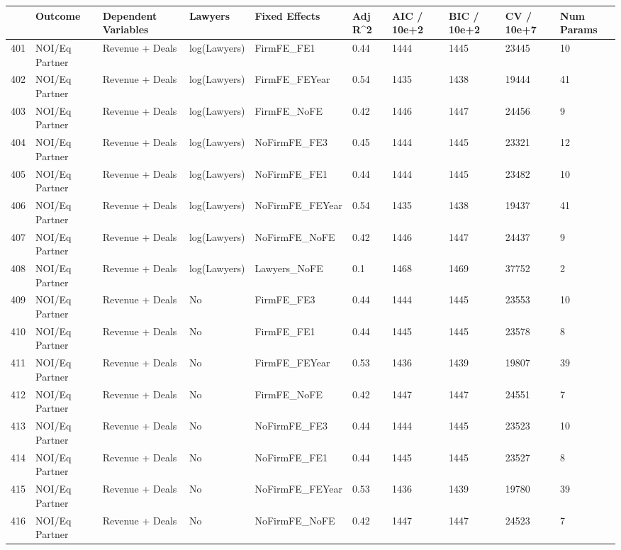 \documentclass{article}
\begin{document}
\begin{table}[H]
\centering
\begin{tabular}{rlllllllll}
  \hline
 & Outcome & Dependent Variables & Lawyers & Fixed Effects & Adj R^2 & AIC / 10e+2 & BIC / 10e+2 & CV / 10e+7 & Num Params \\ 
  \hline
401 & NOI/Eq Partner & Revenue + Deals & log(Lawyers) & FirmFE\_FE1 & 0.44 & 1444 & 1445 & 23445 & 10 \\ 
  402 & NOI/Eq Partner & Revenue + Deals & log(Lawyers) & FirmFE\_FEYear & 0.54 & 1435 & 1438 & 19444 & 41 \\ 
  403 & NOI/Eq Partner & Revenue + Deals & log(Lawyers) & FirmFE\_NoFE & 0.42 & 1446 & 1447 & 24456 & 9 \\ 
  404 & NOI/Eq Partner & Revenue + Deals & log(Lawyers) & NoFirmFE\_FE3 & 0.45 & 1444 & 1445 & 23321 & 12 \\ 
  405 & NOI/Eq Partner & Revenue + Deals & log(Lawyers) & NoFirmFE\_FE1 & 0.44 & 1444 & 1445 & 23482 & 10 \\ 
  406 & NOI/Eq Partner & Revenue + Deals & log(Lawyers) & NoFirmFE\_FEYear & 0.54 & 1435 & 1438 & 19437 & 41 \\ 
  407 & NOI/Eq Partner & Revenue + Deals & log(Lawyers) & NoFirmFE\_NoFE & 0.42 & 1446 & 1447 & 24437 & 9 \\ 
  408 & NOI/Eq Partner & Revenue + Deals & log(Lawyers) & Lawyers\_NoFE & 0.1 & 1468 & 1469 & 37752 & 2 \\ 
  409 & NOI/Eq Partner & Revenue + Deals & No & FirmFE\_FE3 & 0.44 & 1444 & 1445 & 23553 & 10 \\ 
  410 & NOI/Eq Partner & Revenue + Deals & No & FirmFE\_FE1 & 0.44 & 1445 & 1445 & 23578 & 8 \\ 
  411 & NOI/Eq Partner & Revenue + Deals & No & FirmFE\_FEYear & 0.53 & 1436 & 1439 & 19807 & 39 \\ 
  412 & NOI/Eq Partner & Revenue + Deals & No & FirmFE\_NoFE & 0.42 & 1447 & 1447 & 24551 & 7 \\ 
  413 & NOI/Eq Partner & Revenue + Deals & No & NoFirmFE\_FE3 & 0.44 & 1444 & 1445 & 23523 & 10 \\ 
  414 & NOI/Eq Partner & Revenue + Deals & No & NoFirmFE\_FE1 & 0.44 & 1445 & 1445 & 23527 & 8 \\ 
  415 & NOI/Eq Partner & Revenue + Deals & No & NoFirmFE\_FEYear & 0.53 & 1436 & 1439 & 19780 & 39 \\ 
  416 & NOI/Eq Partner & Revenue + Deals & No & NoFirmFE\_NoFE & 0.42 & 1447 & 1447 & 24523 & 7 \\ 

\end{tabular}
\end{table}
\end{document}
